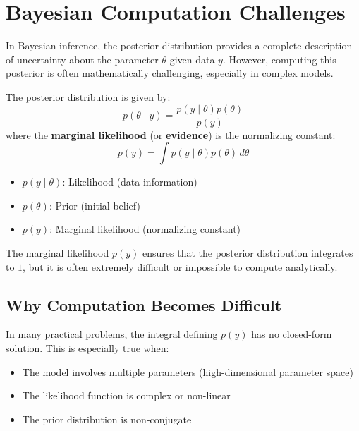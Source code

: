 \documentclass[12pt,a4paper]{article}
\begin{document}
\newpage

\section{Bayesian Computation Challenges}

In Bayesian inference, the posterior distribution provides a complete description of uncertainty about the parameter $\theta$ given data $y$. However, computing this posterior is often mathematically challenging, especially in complex models.

\begin{defbox}
The posterior distribution is given by:
\[
p(\theta \mid y) = \frac{p(y \mid \theta) p(\theta)}{p(y)}
\]
where the \textbf{marginal likelihood} (or \textbf{evidence}) is the normalizing constant:
\[
p(y) = \int p(y \mid \theta) p(\theta) \, d\theta
\]
\end{defbox}

\begin{itemize}[leftmargin=1.5em]
    \item $p(y \mid \theta)$: Likelihood (data information)
    \item $p(\theta)$: Prior (initial belief)
    \item $p(y)$: Marginal likelihood (normalizing constant)
\end{itemize}

\begin{keyidea}
The marginal likelihood $p(y)$ ensures that the posterior distribution integrates to $1$, but it is often extremely difficult or impossible to compute analytically.
\end{keyidea}

\subsection{Why Computation Becomes Difficult}

In many practical problems, the integral defining $p(y)$ has no closed-form solution. This is especially true when:
\begin{itemize}[leftmargin=1.5em]
    \item The model involves multiple parameters (high-dimensional parameter space)
    \item The likelihood function is complex or non-linear
    \item The prior distribution is non-conjugate
\end{itemize}
\end{document}
